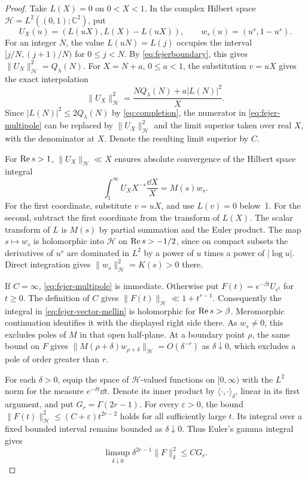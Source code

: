 \begin{proof}
Take \(L(X)=0\) on \(0<X<1\). In the complex Hilbert space
\(\mathcal H=L^2((0,1);\mathbb C^2)\), put
\[
 U_X(u)=(L(uX),L(X)-L(uX)),\qquad w_s(u)=(u^s,1-u^s).
\]
For an integer \(N\), the value \(L(uN)=L(j)\) occupies the
interval \([j/N,(j+1)/N)\) for \(0\le j<N\). By
\eqref{eq:fejerboundary}, this gives
\(\|U_N\|_{\mathcal H}^2=Q_\lambda(N)\). For \(X=N+a\),
\(0\le a<1\), the substitution \(v=uX\) gives the exact
interpolation
\begin{equation}\label{eq:fejer-norm-interpolation}
 \|U_X\|_{\mathcal H}^2
   =\frac{NQ_\lambda(N)+a|L(N)|^2}{X}.
\end{equation}
Since \(|L(N)|^2\le2Q_\lambda(N)\) by \eqref{eq:completion},
the numerator in \eqref{eq:fejer-multipole} can be replaced by
\(\|U_X\|_{\mathcal H}^2\) and the limit superior taken over
real \(X\), with the denominator at \(X\). Denote the resulting
limit superior by \(C\).

For \(\operatorname{Re} s>1\), \(\|U_X\|_{\mathcal H}\ll X\) ensures absolute
convergence of the Hilbert space integral
\begin{equation}\label{eq:fejer-vector-mellin}
 \int_1^\infty U_X X^{-s}\frac{\dd X}{X}=M(s)w_s.
\end{equation}
For the first coordinate, substitute \(v=uX\), and use
\(L(v)=0\) below~1. For the second, subtract the first coordinate
from the transform of \(L(X)\). The scalar transform of \(L\) is
\(M(s)\) by partial summation and the Euler product. The map
\(s\mapsto w_s\) is holomorphic into \(\mathcal H\) on
\(\operatorname{Re} s>-1/2\), since on compact subsets the derivatives of
\(u^s\) are dominated in \(L^2\) by a power of \(u\) times a
power of \(|\log u|\). Direct integration gives
\(\|w_s\|_{\mathcal H}^2=K(s)>0\) there.

If \(C=\infty\), \eqref{eq:fejer-multipole} is immediate.
Otherwise put \(F(t)=e^{-\beta t}U_{e^t}\) for \(t\ge0\).
The definition of \(C\) gives
\(\|F(t)\|_{\mathcal H}\ll 1+t^{r-1}\).
Consequently the integral in \eqref{eq:fejer-vector-mellin}
is holomorphic for \(\operatorname{Re} s>\beta\). Meromorphic continuation
identifies it with the displayed right side there. As
\(w_s\ne0\), this excludes poles of \(M\) in that open
half-plane. At a boundary point \(\rho\), the same bound on
\(F\) gives \(\|M(\rho+\delta)w_{\rho+\delta}\|_{\mathcal H}
=O(\delta^{-r})\) as \(\delta\downarrow0\), which excludes
a pole of order greater than \(r\).

For each \(\delta>0\), equip the space of \(\mathcal H\)-valued
functions on \([0,\infty)\) with the \(L^2\) norm for the
measure \(e^{-\delta t}\dd t\). Denote its inner product by
\(\langle\cdot,\cdot\rangle_\delta\), linear in its first
argument, and put \(G_r=\Gamma(2r-1)\). For every
\(\varepsilon>0\), the bound
\(\|F(t)\|_{\mathcal H}^2\le(C+\varepsilon)t^{2r-2}\) holds
for all sufficiently large \(t\). Its integral over a fixed
bounded interval remains bounded as \(\delta\downarrow0\).
Thus Euler's gamma integral gives
\begin{equation}\label{eq:fejer-multipole-abel}
 \limsup_{\delta\downarrow0}\delta^{2r-1}\|F\|_\delta^2
 \le C G_r.
\end{equation}


\end{proof}
